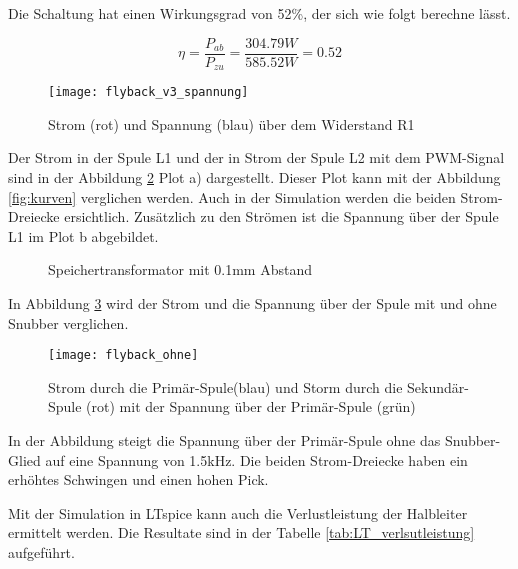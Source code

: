 Die Schaltung hat einen Wirkungsgrad von 52\%, der sich wie folgt berechne lässt. 

\begin{equation}\label{eq:wirkungsgrand}
\eta=\frac{P_{ab}}{P_{zu}}=\frac{304.79W}{585.52W} = 0.52
\end{equation}

\begin{figure}[H]
	\centering
	\texttt{[image: flyback\_v3\_spannung]}
	\caption{Strom (rot) und Spannung (blau) über dem Widerstand R1 }\label{fig:ausgangsstrom}
\end{figure}

Der Strom in der Spule L1 und der in Strom der Spule L2 mit dem PWM-Signal sind in der Abbildung \ref{fig:spule} Plot a) dargestellt. Dieser Plot kann mit der Abbildung \ref{fig:kurven} verglichen werden. Auch in der Simulation werden die beiden Strom-Dreiecke ersichtlich. Zusätzlich zu den Strömen ist die Spannung über der Spule L1  im Plot b abgebildet.

\begin{figure}[H]
	\centering
	\qquad
	\caption{Speichertransformator mit 0.1mm Abstand}
	\label{fig:spule}
\end{figure}
\newpage
In Abbildung \ref{fig:LT_snubber} wird der Strom und die Spannung über der Spule mit und ohne Snubber verglichen.

\begin{figure}[H]
	\centering
	\texttt{[image: flyback\_ohne]}
	\caption{Strom durch die Primär-Spule(blau) und Storm durch die Sekundär-Spule (rot) mit der Spannung über der Primär-Spule (grün) }\label{fig:LT_snubber}
\end{figure}

In der Abbildung steigt die Spannung über der Primär-Spule ohne das Snubber-Glied auf eine Spannung von 1.5kHz. Die beiden Strom-Dreiecke haben ein erhöhtes Schwingen und einen hohen Pick. 

Mit der Simulation in LTspice kann auch die Verlustleistung der Halbleiter ermittelt werden. Die Resultate sind in der Tabelle \ref{tab:LT_verlsutleistung} aufgeführt.

